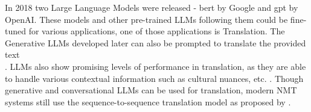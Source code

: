 In 2018 two Large Language Models were released - \gls{bert} \cite{devlin2018bert} by Google and \gls{gpt} \cite{radford2018improving} by OpenAI. These models and other pre-trained LLMs following them could be fine-tuned for various applications, one of those applications is Translation. The Generative LLMs developed later can also be prompted to translate the provided text \\ \cite{klamra2023evaluating}. LLMs also show promising levels of performance in translation, as they are able to handle various contextual information such as cultural nuances, etc. \cite{yao2023empowering}. Though generative and conversational LLMs can be used for translation, modern NMT systems still use the sequence-to-sequence translation model as proposed by \cite{sutskever2014sequence}.